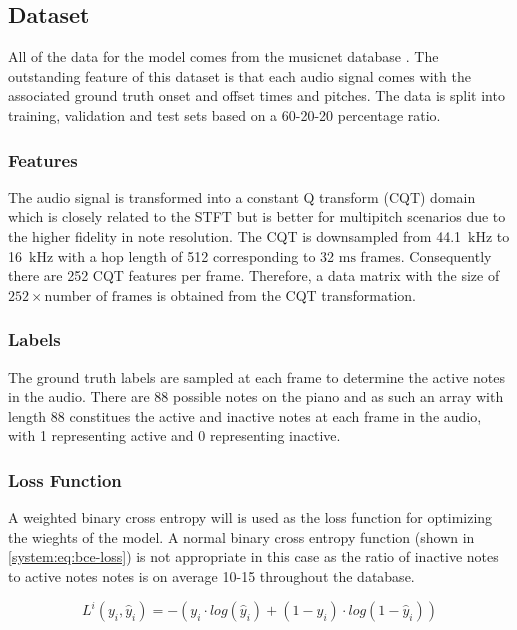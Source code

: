 \subsection{Dataset}

All of the data for the model comes from the musicnet database \cite{thickstun2018invariances}.
The outstanding feature of this dataset is that each audio signal comes with the associated ground truth
onset and offset times and pitches. The data is split into training, validation and test sets based on a 60-20-20
percentage ratio.

\subsubsection{Features}
The audio signal is transformed into a constant Q transform (CQT) domain
which is closely related to the STFT but is better for multipitch scenarios due
to the higher fidelity in note resolution. The CQT is downsampled from
44.1~$\si{\kilo\hertz}$ to 16~$\si{\kilo\hertz}$ with a hop length of 512
corresponding to 32 $\si{\milli\second}$ frames. Consequently there are 252 CQT
features per frame. Therefore, a data matrix with the size of $252 \times
    \text{number of frames}$ is obtained from the CQT transformation.

\subsubsection{Labels}
The ground truth labels are sampled at each frame to determine the active notes
in the audio. There are 88 possible notes on the piano and as such an array with
length 88 constitues the active and inactive notes at each frame in the audio,
with 1 representing active and 0 representing inactive.

\subsubsection{Loss Function}

A weighted binary cross entropy will is used as the loss function for optimizing
the wieghts of the model. A normal binary cross entropy function (shown in \autoref{system:eq:bce-loss}) is not
appropriate in this case as the ratio of inactive notes to active notes notes is
on average 10-15 throughout the database.

\begin{equation}
    L^{i} (y_{i}, \hat{y}_{i}) = -(y_{i}\cdot log(\hat{y}_{i}) + (1-y_{i}) \cdot log(1-\hat{y}_{i}))
    \label{system:eq:bce-loss}
\end{equation}


